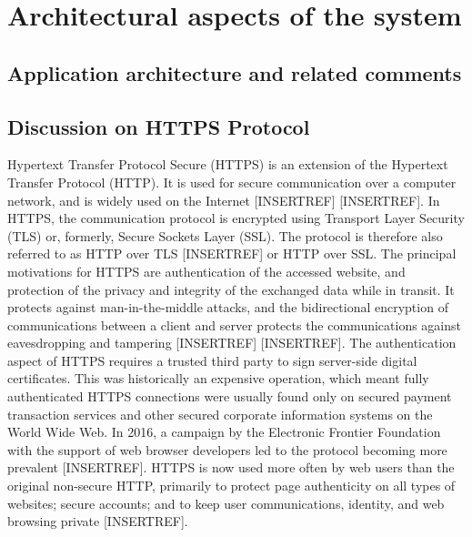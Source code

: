 \chapter{Architectural aspects of the system}\label{ch:architectural-aspects-of-the-system}


\section{Application architecture and related comments}\label{sec:application-architecture-and-related-comments}




\section{Discussion on HTTPS Protocol}\label{sec:discussion-on-https-protocol}
Hypertext Transfer Protocol Secure (HTTPS) is an extension of the Hypertext Transfer Protocol (HTTP).
It is used for secure communication over a computer network, and is widely used on the Internet [INSERTREF] [INSERTREF].
In HTTPS, the communication protocol is encrypted using Transport Layer Security (TLS) or, formerly, Secure Sockets Layer (SSL).
The protocol is therefore also referred to as HTTP over TLS [INSERTREF] or HTTP over SSL\@.
The principal motivations for HTTPS are authentication of the accessed website, and protection of the privacy and integrity
of the exchanged data while in transit.
It protects against man-in-the-middle attacks, and the bidirectional encryption of communications between a client and
server protects the communications against eavesdropping and tampering [INSERTREF] [INSERTREF].
The authentication aspect of HTTPS requires a trusted third party to sign server-side digital certificates.
This was historically an expensive operation, which meant fully authenticated HTTPS connections were usually found only
on secured payment transaction services and other secured corporate information systems on the World Wide Web.
In 2016, a campaign by the Electronic Frontier Foundation with the support of web browser developers led to the protocol
becoming more prevalent [INSERTREF].
HTTPS is now used more often by web users than the original non-secure HTTP, primarily to protect
page authenticity on all types of websites;
secure accounts;
and to keep user communications, identity, and web browsing private [INSERTREF].

